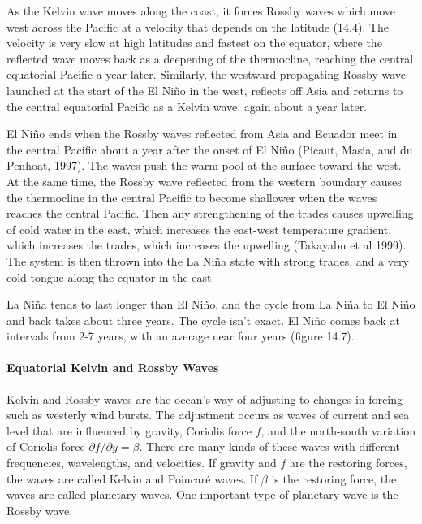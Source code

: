 As the Kelvin wave moves along the coast, it forces Rossby waves which move west across the Pacific at a velocity that depends on the latitude (14.4). The velocity is very slow at high latitudes and fastest on the equator, where  the reflected wave moves back as a deepening of the thermocline, reaching the central equatorial Pacific a year later. Similarly, the westward propagating Rossby wave launched at the start of the El Ni\~{n}o in the west, reflects off Asia and returns to the central equatorial Pacific as a Kelvin wave, again about a year later.

El Ni\~{n}o ends when the Rossby waves reflected from Asia and Ecuador meet in the central Pacific about a year after the onset of El Ni\~{n}o (Picaut, Masia, and du Penhoat, 1997). The waves push the warm pool at the surface toward the west. At the same time, the Rossby wave reflected from the western boundary causes the thermocline in the central
Pacific to become shallower when the waves reaches the central Pacific. Then any strengthening of the trades causes upwelling of cold water in the east, which increases the east-west temperature gradient, which increases the trades, which increases the upwelling (Takayabu et al 1999). The system is then thrown into the La Ni\~{n}a state with strong trades, and a very cold tongue along the equator in the east.

La Ni\~{n}a tends to last longer than  El Ni\~{n}o, and the cycle from La Ni\~{n}a to El Ni\~{n}o and back takes about three years. The cycle isn't exact. El Ni\~{n}o comes back at intervals from 2-7 years, with an average near four years (figure 14.7).

\paragraph{Equatorial Kelvin and Rossby Waves}
Kelvin and Rossby waves are the ocean's way of adjusting to changes in forcing such as westerly wind bursts. The adjustment occurs as waves of current and sea level that are influenced by gravity, Coriolis force $f$, and the north-south variation of Coriolis force $\partial f/\partial y = \beta$. There are many kinds of these waves with different frequencies, wavelengths, and velocities. If gravity and $f$ are the restoring forces, the waves are called Kelvin and Poincar\'{e} waves. If $\beta $ is the restoring force, the waves are called planetary waves. One important type of planetary wave is the Rossby wave.

